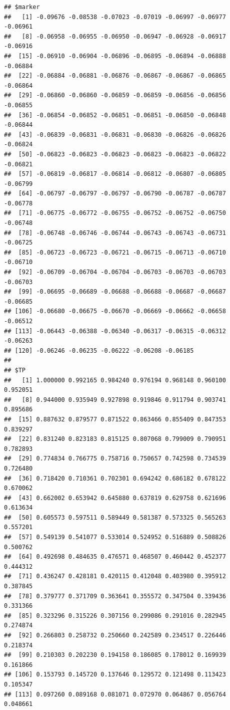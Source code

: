 \documentclass{article}\usepackage[]{graphicx}\usepackage[]{color}
\makeatletter
\newenvironment{kframe}{%
 \def\at@end@of@kframe{}%
 \ifinner\ifhmode%
  \def\at@end@of@kframe{\end{minipage}}%
  \begin{minipage}{\columnwidth}%
 \fi\fi%
 \def\FrameCommand##1{\hskip\@totalleftmargin \hskip-\fboxsep
 \colorbox{shadecolor}{##1}\hskip-\fboxsep
     \hskip-\linewidth \hskip-\@totalleftmargin \hskip\columnwidth}%
 \MakeFramed {\advance\hsize-\width
   \@totalleftmargin\z@ \linewidth\hsize
   \@setminipage}}%
 {\par\unskip\endMakeFramed%
 \at@end@of@kframe}
\newenvironment{knitrout}{}{} %
\makeatother
\begin{document}
\begin{knitrout}
\begin{kframe}\begin{verbatim}
## $marker
##   [1] -0.09676 -0.08538 -0.07023 -0.07019 -0.06997 -0.06977 -0.06961
##   [8] -0.06958 -0.06955 -0.06950 -0.06947 -0.06928 -0.06917 -0.06916
##  [15] -0.06910 -0.06904 -0.06896 -0.06895 -0.06894 -0.06888 -0.06884
##  [22] -0.06884 -0.06881 -0.06876 -0.06867 -0.06867 -0.06865 -0.06864
##  [29] -0.06860 -0.06860 -0.06859 -0.06859 -0.06856 -0.06856 -0.06855
##  [36] -0.06854 -0.06852 -0.06851 -0.06851 -0.06850 -0.06848 -0.06844
##  [43] -0.06839 -0.06831 -0.06831 -0.06830 -0.06826 -0.06826 -0.06824
##  [50] -0.06823 -0.06823 -0.06823 -0.06823 -0.06823 -0.06822 -0.06821
##  [57] -0.06819 -0.06817 -0.06814 -0.06812 -0.06807 -0.06805 -0.06799
##  [64] -0.06797 -0.06797 -0.06797 -0.06790 -0.06787 -0.06787 -0.06778
##  [71] -0.06775 -0.06772 -0.06755 -0.06752 -0.06752 -0.06750 -0.06748
##  [78] -0.06748 -0.06746 -0.06744 -0.06743 -0.06743 -0.06731 -0.06725
##  [85] -0.06723 -0.06723 -0.06721 -0.06715 -0.06713 -0.06710 -0.06710
##  [92] -0.06709 -0.06704 -0.06704 -0.06703 -0.06703 -0.06703 -0.06703
##  [99] -0.06695 -0.06689 -0.06688 -0.06688 -0.06687 -0.06687 -0.06685
## [106] -0.06680 -0.06675 -0.06670 -0.06669 -0.06662 -0.06658 -0.06512
## [113] -0.06443 -0.06388 -0.06340 -0.06317 -0.06315 -0.06312 -0.06263
## [120] -0.06246 -0.06235 -0.06222 -0.06208 -0.06185
## 
## $TP
##   [1] 1.000000 0.992165 0.984240 0.976194 0.968148 0.960100 0.952051
##   [8] 0.944000 0.935949 0.927898 0.919846 0.911794 0.903741 0.895686
##  [15] 0.887632 0.879577 0.871522 0.863466 0.855409 0.847353 0.839297
##  [22] 0.831240 0.823183 0.815125 0.807068 0.799009 0.790951 0.782893
##  [29] 0.774834 0.766775 0.758716 0.750657 0.742598 0.734539 0.726480
##  [36] 0.718420 0.710361 0.702301 0.694242 0.686182 0.678122 0.670062
##  [43] 0.662002 0.653942 0.645880 0.637819 0.629758 0.621696 0.613634
##  [50] 0.605573 0.597511 0.589449 0.581387 0.573325 0.565263 0.557201
##  [57] 0.549139 0.541077 0.533014 0.524952 0.516889 0.508826 0.500762
##  [64] 0.492698 0.484635 0.476571 0.468507 0.460442 0.452377 0.444312
##  [71] 0.436247 0.428181 0.420115 0.412048 0.403980 0.395912 0.387845
##  [78] 0.379777 0.371709 0.363641 0.355572 0.347504 0.339436 0.331366
##  [85] 0.323296 0.315226 0.307156 0.299086 0.291016 0.282945 0.274874
##  [92] 0.266803 0.258732 0.250660 0.242589 0.234517 0.226446 0.218374
##  [99] 0.210303 0.202230 0.194158 0.186085 0.178012 0.169939 0.161866
## [106] 0.153793 0.145720 0.137646 0.129572 0.121498 0.113423 0.105347
## [113] 0.097260 0.089168 0.081071 0.072970 0.064867 0.056764 0.048661

\end{verbatim}
\end{kframe}
\end{knitrout}
\end{document}
